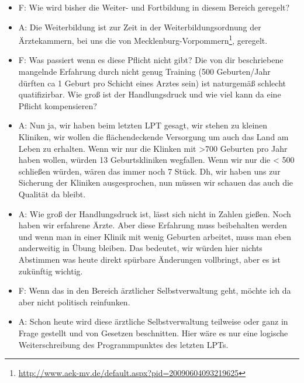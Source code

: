 \begin{itemize}
\item
  F: Wie wird bisher die Weiter- und Fortbildung in diesem Bereich geregelt?
\item
  A: Die Weiterbildung ist zur Zeit in der Weiterbildungsordnung der Ärztekammern, bei uns die von Mecklenburg-Vorpommern\footnote{\url{http://www.aek-mv.de/default.aspx?pid=20090604093219625}}, geregelt.
\end{itemize}
\begin{itemize}
\item
  F: Was passiert wenn es diese Pflicht nicht gibt? Die von dir beschriebene mangelnde Erfahrung durch nicht genug Training (500 Geburten/Jahr dürften ca 1 Geburt pro Schicht eines Arztes sein) ist naturgemäß schlecht quatifizirbar. Wie groß ist der Handlungsdruck und wie viel kann da eine Pflicht kompensieren?
\item
  A: Nun ja, wir haben beim letzten LPT gesagt, wir stehen zu kleinen Kliniken, wir wollen die flächendeckende Versorgung um auch das Land am Leben zu erhalten. Wenn wir nur die Klinken mit \textgreater{}700 Geburten pro Jahr haben wollen, würden 13 Geburtskliniken wegfallen. Wenn wir nur die \textless{} 500 schließen würden, wären das immer noch 7 Stück. Dh, wir haben uns zur Sicherung der Kliniken ausgesprochen, nun müssen wir schauen das auch die Qualität da bleibt.
\item
  A: Wie groß der Handlungsdruck ist, lässt sich nicht in Zahlen gießen. Noch haben wir erfahrene Ärzte. Aber diese Erfahrung muss beibehalten werden und wenn man in einer Klinik mit wenig Geburten arbeitet, muss man eben anderweitig in Übung bleiben. Das bedeutet, wir würden hier nichts Abstimmen was heute direkt spürbare Änderungen vollbringt, aber es ist zukünftig wichtig.
\end{itemize}
\begin{itemize}
\item
  F: Wenn das in den Bereich ärztlicher Selbstverwaltung geht, möchte ich da aber nicht politisch reinfunken.
\item
  A: Schon heute wird diese ärztliche Selbstverwaltung teilweise oder ganz in Frage gestellt und von Gesetzen beschnitten. Hier wäre es nur eine logische Weiterschreibung des Programmpunktes des letzten LPTs.
\end{itemize}
